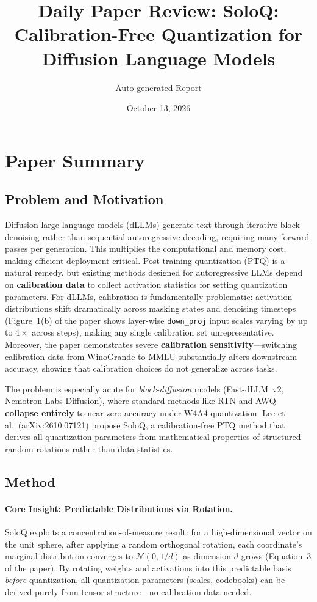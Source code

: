 \documentclass[11pt,a4paper]{article}
\title{Daily Paper Review: SoloQ: Calibration-Free Quantization for Diffusion Language Models}
\author{Auto-generated Report}
\date{October 13, 2026}
\begin{document}
\maketitle

\section{Paper Summary}

\subsection{Problem and Motivation}
Diffusion large language models (dLLMs) generate text through iterative block denoising rather than sequential autoregressive decoding, requiring many forward passes per generation. This multiplies the computational and memory cost, making efficient deployment critical. Post-training quantization (PTQ) is a natural remedy, but existing methods designed for autoregressive LLMs depend on \textbf{calibration data} to collect activation statistics for setting quantization parameters. For dLLMs, calibration is fundamentally problematic: activation distributions shift dramatically across masking states and denoising timesteps (Figure~1(b) of the paper shows layer-wise \texttt{down\_proj} input scales varying by up to $4\times$ across steps), making any single calibration set unrepresentative. Moreover, the paper demonstrates severe \textbf{calibration sensitivity}---switching calibration data from WinoGrande to MMLU substantially alters downstream accuracy, showing that calibration choices do not generalize across tasks.

The problem is especially acute for \emph{block-diffusion} models (Fast-dLLM~v2, Nemotron-Labs-Diffusion), where standard methods like RTN and AWQ \textbf{collapse entirely} to near-zero accuracy under W4A4 quantization. Lee et al.\ (arXiv:2610.07121) propose SoloQ, a calibration-free PTQ method that derives all quantization parameters from mathematical properties of structured random rotations rather than data statistics.

\subsection{Method}
\paragraph{Core Insight: Predictable Distributions via Rotation.}
SoloQ exploits a concentration-of-measure result: for a high-dimensional vector on the unit sphere, after applying a random orthogonal rotation, each coordinate's marginal distribution converges to $\mathcal{N}(0, 1/d)$ as dimension $d$ grows (Equation~3 of the paper). By rotating weights and activations into this predictable basis \emph{before} quantization, all quantization parameters (scales, codebooks) can be derived purely from tensor structure---no calibration data needed.
\end{document}

